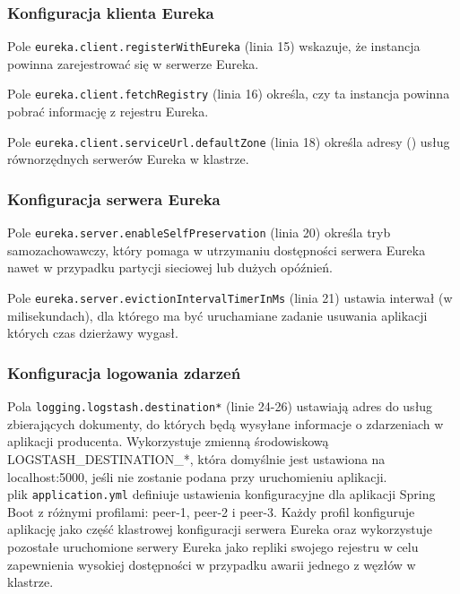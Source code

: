 \subsubsection{Konfiguracja klienta Eureka}

Pole \verb|eureka.client.registerWithEureka| (linia 15) wskazuje, że instancja powinna zarejestrować się w serwerze Eureka.

Pole \verb|eureka.client.fetchRegistry| (linia 16) określa, czy ta instancja powinna pobrać informację z rejestru Eureka.

Pole \verb|eureka.client.serviceUrl.defaultZone| (linia 18) określa adresy  () usług równorzędnych serwerów Eureka w klastrze.

\subsubsection{Konfiguracja serwera Eureka}

Pole \verb|eureka.server.enableSelfPreservation| (linia 20) określa tryb samozachowawczy, który pomaga w utrzymaniu dostępności serwera Eureka nawet w przypadku partycji sieciowej lub dużych opóźnień.

Pole \verb|eureka.server.evictionIntervalTimerInMs| (linia 21) ustawia interwał (w milisekundach), dla którego ma być uruchamiane zadanie usuwania aplikacji których czas dzierżawy wygasł.

\subsubsection{Konfiguracja logowania zdarzeń}

Pola \verb|logging.logstash.destination*| (linie 24-26) ustawiają adres do usług zbierających dokumenty, do których będą wysyłane informacje o zdarzeniach w aplikacji producenta. Wykorzystuje zmienną środowiskową LOGSTASH\_DESTINATION\_*, która domyślnie jest ustawiona na localhost:5000, jeśli nie zostanie podana przy uruchomieniu aplikacji.\\[0.5cm]

plik \verb|application.yml| definiuje ustawienia konfiguracyjne dla aplikacji Spring Boot z różnymi profilami: peer-1, peer-2 i peer-3. Każdy profil konfiguruje aplikację jako część klastrowej konfiguracji serwera Eureka oraz wykorzystuje pozostałe uruchomione serwery Eureka jako repliki swojego rejestru w celu zapewnienia wysokiej dostępności w przypadku awarii jednego z węzłów w klastrze.

